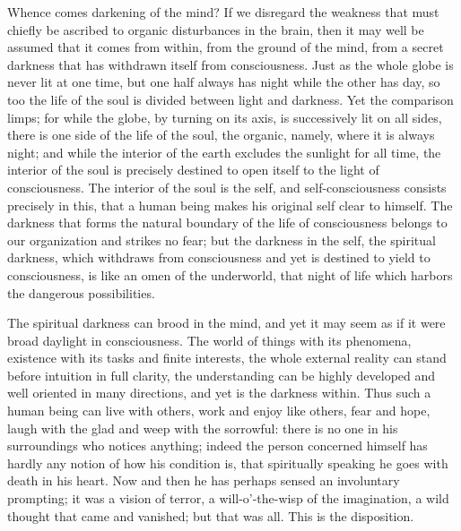 \documentclass[12pt,a4paper,openany]{book}
\newcommand{\opage}[1]{\marginnote{\footnotesize\textit{[#1]}}}
\begin{document}
Whence comes darkening of the mind? If we disregard the weakness that must chiefly be ascribed to organic disturbances in the brain, then it may well be assumed that it comes from within, from the ground of the mind, from a secret darkness that has withdrawn itself from consciousness. Just as the whole globe is never lit at one time, but one half always has night while the other has day, so too the life of the soul is divided between light and darkness. Yet the comparison limps; for while the globe, by turning on its axis, is successively lit on all sides, there is one side of the life of the soul, the organic, namely, where it is always night; and while the interior of the earth excludes the sunlight for all time, the interior of the soul is precisely destined to open itself to the light of consciousness. The interior of the soul is the self, and self-consciousness consists precisely in this, that a human being makes his original self clear to himself. The darkness that forms the natural boundary of the life of consciousness belongs to our organization and strikes no fear; but the darkness in the self, the spiritual darkness, which withdraws from consciousness and yet is destined to yield to consciousness, is like an omen of the underworld, that night of life which harbors the dangerous possibilities.

The spiritual darkness can brood in the mind, and yet it may seem as if it were broad daylight in consciousness. The world of things with its phenomena, existence with its tasks and finite interests, the whole external reality can stand before intuition in full clarity, the understanding can be highly developed and well oriented in many directions, and yet is the darkness
\setcounter{footnote}{0}%
\opage{699}within. Thus such a human being can live with others, work and enjoy like others, fear and hope, laugh with the glad and weep with the sorrowful: there is no one in his surroundings who notices anything; indeed the person concerned himself has hardly any notion of how his condition is, that spiritually speaking he goes with death in his heart. Now and then he has perhaps sensed an involuntary prompting; it was a vision of terror, a will-o'-the-wisp of the imagination, a wild thought that came and vanished; but that was all. This is the disposition.
\end{document}
